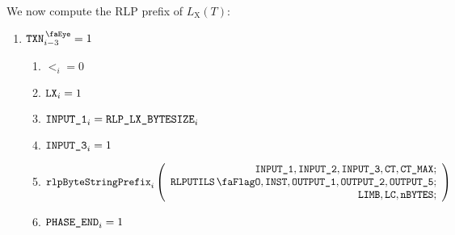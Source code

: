 We now compute the RLP prefix of $L_{\mathrm{X}}(T)$:
\begin{enumerate}[resume]
	\item \If $\isTxn_{i-3}=1$ \Then
	\begin{enumerate}
		\item $\lt_{i}=0$
		\item $\texttt{LX}_{i}=1$
		\item $\texttt{INPUT\_1}_{i} = \texttt{RLP\_LX\_BYTESIZE}_{i}$
		\item $\texttt{INPUT\_3}_{i} = 1$ 
		\item 
				\[
    			\rlpBytestringPrefix_{i}
    			\left(
				\begin{array}{r}
    			\inputColumn{1},
    			\inputColumn{2},
    			\inputColumn{3},
    			\ct,
    			\maxCt; \\
    			\rlpUtilsFlag,
    			\INST,
    			\resultColumn{1},
    			\resultColumn{2},
    			\resultColumn{5}; \\
    			\limb,
    			\lc,
    			\limbsize; \\
    			\end{array}
				\right)
				\]
		\item \If $\texttt{PHASE\_END}_{i}=1$
	\end{enumerate}
\end{enumerate}

